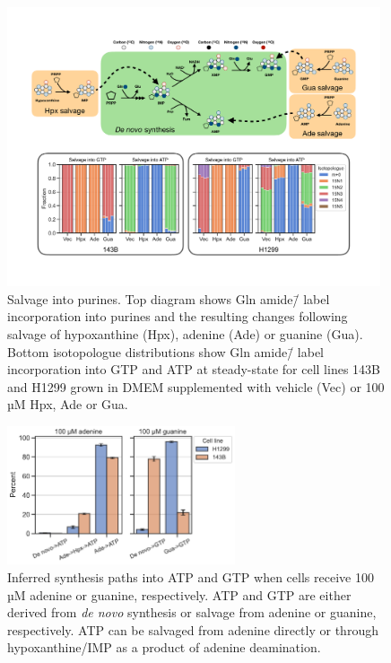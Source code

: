 \begin{figure}
    \centering
    \includegraphics[width=0.98\textwidth]{figures/chap2/sal_frac_pur.pdf}
    \caption[Salvage into purines.]{
    Salvage into purines.
    Top diagram shows Gln amide\=/\hNi{} label incorporation into purines and the resulting changes following salvage of hypoxanthine (Hpx), adenine (Ade) or guanine (Gua).
    Bottom isotopologue distributions show Gln amide\=/\hNi{} label incorporation into GTP and ATP at steady-state for cell lines 143B and H1299 grown in DMEM supplemented with vehicle (Vec) or 100 µM Hpx, Ade or Gua.
    }
    \label{fig:ch2:sal_frac_pur}
\end{figure}

\begin{figure}
    \centering
    \includegraphics[width=0.6\textwidth]{figures/chap2/sal_frac_pur_paths.pdf}
    \caption[Inferred synthesis paths into purines.]{
    Inferred synthesis paths into ATP and GTP when cells receive 100 µM adenine or guanine, respectively.
    ATP and GTP are either derived from \textit{de novo} synthesis or salvage from adenine or guanine, respectively.
    ATP can be salvaged from adenine directly or through hypoxanthine/IMP as a product of adenine deamination.
    }
    \label{fig:ch2:sal_frac_pur_paths}
\end{figure}





